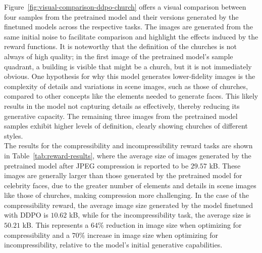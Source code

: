 \noindent Figure~\ref{fig:visual-comparison-ddpo-church} offers a visual comparison between four samples from the pretrained model and their versions generated by the finetuned models across the respective tasks. The images are generated from the same initial noise to facilitate comparison and highlight the effects induced by the reward functions. It is noteworthy that the definition of the churches is not always of high quality; in the first image of the pretrained model's sample quadrant, a building is visible that might be a church, but it is not immediately obvious. One hypothesis for why this model generates lower-fidelity images is the complexity of details and variations in scene images, such as those of churches, compared to other concepts like the elements needed to generate faces. This likely results in the model not capturing details as effectively, thereby reducing its generative capacity. The remaining three images from the pretrained model samples exhibit higher levels of definition, clearly showing churches of different styles. \\

\noindent The results for the compressibility and incompressibility reward tasks are shown in Table~\ref{tab:reward-results}, where the average size of images generated by the pretrained model after JPEG compression is reported to be $29.57$ kB. These images are generally larger than those generated by the pretrained model for celebrity faces, due to the greater number of elements and details in scene images like those of churches, making compression more challenging. In the case of the compressibility reward, the average image size generated by the model finetuned with DDPO is $10.62$ kB, while for the incompressibility task, the average size is $50.21$ kB. This represents a $64\%$ reduction in image size when optimizing for compressibility and a $70\%$ increase in image size when optimizing for incompressibility, relative to the model's initial generative capabilities. \\

